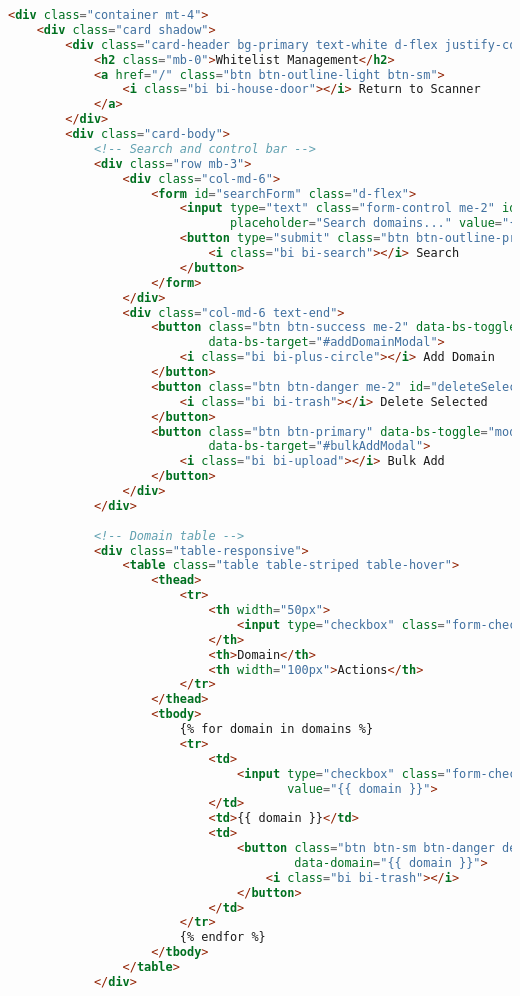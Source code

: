 \begin{lstlisting}[language=HTML, caption=Whitelist Template Excerpt]
<div class="container mt-4">
    <div class="card shadow">
        <div class="card-header bg-primary text-white d-flex justify-content-between align-items-center">
            <h2 class="mb-0">Whitelist Management</h2>
            <a href="/" class="btn btn-outline-light btn-sm">
                <i class="bi bi-house-door"></i> Return to Scanner
            </a>
        </div>
        <div class="card-body">
            <!-- Search and control bar -->
            <div class="row mb-3">
                <div class="col-md-6">
                    <form id="searchForm" class="d-flex">
                        <input type="text" class="form-control me-2" id="searchInput" 
                               placeholder="Search domains..." value="{{ search }}">
                        <button type="submit" class="btn btn-outline-primary">
                            <i class="bi bi-search"></i> Search
                        </button>
                    </form>
                </div>
                <div class="col-md-6 text-end">
                    <button class="btn btn-success me-2" data-bs-toggle="modal" 
                            data-bs-target="#addDomainModal">
                        <i class="bi bi-plus-circle"></i> Add Domain
                    </button>
                    <button class="btn btn-danger me-2" id="deleteSelectedBtn">
                        <i class="bi bi-trash"></i> Delete Selected
                    </button>
                    <button class="btn btn-primary" data-bs-toggle="modal" 
                            data-bs-target="#bulkAddModal">
                        <i class="bi bi-upload"></i> Bulk Add
                    </button>
                </div>
            </div>
            
            <!-- Domain table -->
            <div class="table-responsive">
                <table class="table table-striped table-hover">
                    <thead>
                        <tr>
                            <th width="50px">
                                <input type="checkbox" class="form-check-input" id="selectAll">
                            </th>
                            <th>Domain</th>
                            <th width="100px">Actions</th>
                        </tr>
                    </thead>
                    <tbody>
                        {% for domain in domains %}
                        <tr>
                            <td>
                                <input type="checkbox" class="form-check-input domain-checkbox" 
                                       value="{{ domain }}">
                            </td>
                            <td>{{ domain }}</td>
                            <td>
                                <button class="btn btn-sm btn-danger delete-btn" 
                                        data-domain="{{ domain }}">
                                    <i class="bi bi-trash"></i>
                                </button>
                            </td>
                        </tr>
                        {% endfor %}
                    </tbody>
                </table>
            </div>
            

\end{lstlisting}
